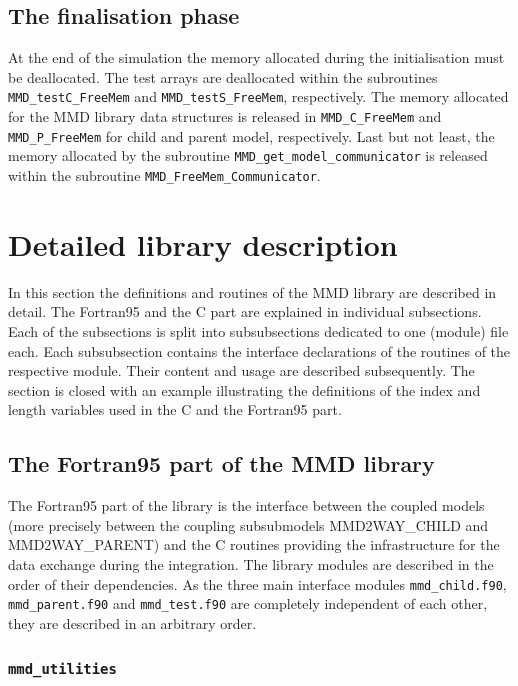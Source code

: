 \documentclass[twoside]{article}
\begin{document}
\subsection{The finalisation phase} \label{ssec:finalp}
At the end of the simulation the memory allocated during the initialisation must
be deallocated. The test arrays are deallocated within the subroutines 
\verb|MMD_testC_FreeMem| and \verb|MMD_testS_FreeMem|, respectively.
 The memory allocated
for the MMD library data structures is released in \verb|MMD_C_FreeMem| and 
\verb|MMD_P_FreeMem| for child and parent model, respectively.
Last but not least, the memory allocated by the subroutine 
\verb|MMD_get_model_communicator| is released within the subroutine 
\verb|MMD_FreeMem_Communicator|.

\section{Detailed library description}\label{sec:MMDdescript}
In this section the definitions and routines of the MMD library are
described in detail. The Fortran95 and the C part are explained in individual 
subsections. Each of the subsections is split into subsubsections dedicated to 
one (module) file each. 
Each subsubsection contains the interface declarations of the routines 
of the respective module. Their content and usage are described subsequently.
The section is closed with an example illustrating the definitions of the
index and length variables used in the C and the Fortran95 part.
\subsection{The Fortran95 part of the MMD library}\label{sec:MMD-Fortran}
The Fortran95 part of the library is the interface between the coupled models
(more precisely between the coupling subsubmodels MMD2WAY\_CHILD and
MMD2WAY\_PARENT) 
and the C routines providing the infrastructure for the data exchange during the
 integration. The library modules are described in the order of their 
dependencies. As the three main interface modules \verb|mmd_child.f90|, 
\verb|mmd_parent.f90| and \verb|mmd_test.f90| are completely
independent of each other, they are described in an arbitrary order.

\subsubsection{\tt mmd\_utilities}\label{sec:mmd_util}
\end{document}
